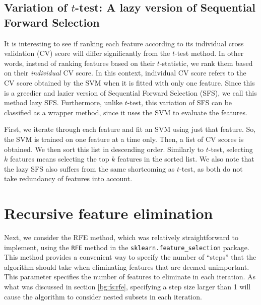 \documentclass[12pt, twoside, a4paper]{report}
\begin{document}



\subsection{Variation of $t$-test: A lazy version of Sequential Forward Selection} \label{body:sfs:lazy}

It is interesting to see if ranking each feature according to its individual cross validation (CV) score will differ significantly from the $t$-test method. In other words, instead of ranking features based on their $t$-statistic, we rank them based on their \textit{individual} CV score. In this context, individual CV score refers to the CV score obtained by the SVM when it is fitted with only one feature. Since this is a greedier and lazier version of Sequential Forward Selection (SFS), we call this method lazy SFS. Furthermore, unlike $t$-test, this variation of SFS can be classified as a wrapper method, since it uses the SVM to evaluate the features.

First, we iterate through each feature and fit an SVM using just that feature. So, the SVM is trained on one feature at a time only. Then, a list of CV scores is obtained. We then sort this list in descending order. Similarly to $t$-test, selecting $k$ features means selecting the top $k$ features in the sorted list. We also note that the lazy SFS also suffers from the same shortcoming as $t$-test, as both do not take redundancy of features into account.

\section{Recursive feature elimination} \label{body:rfe}

Next, we consider the RFE method, which was relatively straightforward to implement, using the \texttt{RFE} method in the \texttt{sklearn.feature\_selection} package. This method provides a convenient way to specify the number of ``steps'' that the algorithm should take when eliminating features that are deemed unimportant. This parameter specifies the number of features to eliminate in each iteration. As what was discussed in section \ref{bg:fs:rfe}, specifying a step size larger than 1 will cause the algorithm to consider nested subsets in each iteration.
\end{document}
